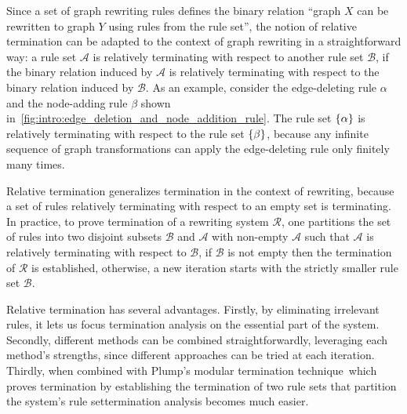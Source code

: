Since a set of graph rewriting rules defines the binary relation \enquote{graph $X$ can be rewritten to graph $Y$ using rules from the rule set},
the notion of relative termination can be adapted to the context of graph rewriting in a straightforward way: a rule set $\mathcal{A}$ is relatively terminating with respect to another rule set $\mathcal{B}$, if the binary relation induced by $\mathcal{A}$ is relatively terminating with respect to the binary relation induced by $\mathcal{B}$.
As an example, consider the edge-deleting rule $\alpha$ and the node-adding rule $\beta$ shown in~\autoref{fig:intro:edge_deletion_and_node_addition_rule}. The rule set $\{\alpha\}$ is relatively terminating with respect to the rule set $\{\beta\}$, because any infinite sequence of graph transformations can apply the edge-deleting rule only finitely many times.

Relative termination generalizes termination in the context of rewriting, because a set of rules relatively terminating with respect to an empty set is terminating. In practice, to prove termination of a rewriting system $\mathcal{R}$, one partitions the set of rules into two disjoint subsets \( \mathcal{B} \) and \( \mathcal{A} \) with non-empty $\mathcal{A}$ such that \( \mathcal{A} \) is relatively terminating with respect to \( \mathcal{B} \), if $\mathcal{B}$ is not empty then the termination of $\mathcal{R}$ is established, otherwise, a new iteration starts with the strictly smaller rule set $\mathcal{B}$.
 
Relative termination has several advantages.
  Firstly, by eliminating irrelevant rules, it lets us focus termination analysis on the essential part of the system.
  Secondly, different methods can be combined straightforwardly, leveraging each method's strengths, since different approaches can be tried at each iteration.
   Thirdly, when combined with Plump's modular termination technique~\cite{plump2018modular}\textemdash which proves termination by establishing the termination of two rule sets that partition the system's rule set\textemdash termination analysis becomes much easier.


